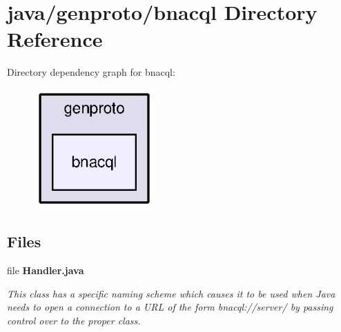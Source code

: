 \section{java/genproto/bnacql Directory Reference}
\label{dir_7d2d6ec2c0f74019ddb571c371755f50}
Directory dependency graph for bnacql\+:
\nopagebreak
\begin{figure}[H]
\begin{center}
\leavevmode
\includegraphics[width=130pt]{dir_7d2d6ec2c0f74019ddb571c371755f50_dep}
\end{center}
\end{figure}
\subsection*{Files}
\begin{DoxyCompactItemize}
\item 
file {\bf Handler.\+java}
\begin{DoxyCompactList}\small\item\em This class has a specific naming scheme which causes it to be used when Java needs to open a connection to a U\+R\+L of the form bnacql\+://server/ by passing control over to the proper class. \end{DoxyCompactList}\end{DoxyCompactItemize}
